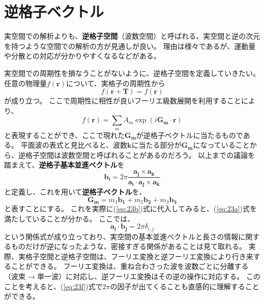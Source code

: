 \documentclass[a4paper]{jsreport}
\begin{document}
        \section{逆格子ベクトル}
            実空間での解析よりも、\textbf{逆格子空間}（波数空間）と呼ばれる、実空間と逆の次元を持つような空間での解析の方が見通しが良い。
            理由は様々であるが、運動量や分散との対応が分かりやすくなるなどがある。\par
            実空間での周期性を損なうことがないように、逆格子空間を定義していきたい。
            任意の物理量$f(\boldsymbol{r})$について、実格子の周期性から
            \begin{equation} \label{eq:23a}
                f(\boldsymbol{r} + \boldsymbol{T}) = f(\boldsymbol{r})
            \end{equation}
            が成り立つ。
            ここで周期性に相性が良いフーリエ級数展開を利用することにより、
            \begin{equation} \label{eq:23b}
                f(\boldsymbol{r}) = \sum_{m} A_m \exp(i\boldsymbol{G_m} \cdot \boldsymbol{r})
            \end{equation}
            と表現することができ、ここで現れた$\boldsymbol{G_m}$が逆格子ベクトルに当たるものである。
            平面波の表式と見比べると、波数$\boldsymbol{k}$に当たる部分が$\boldsymbol{G_m}$になっていることから、逆格子空間は波数空間と呼ばれることがあるのだろう。
            以上までの議論を踏まえて、\textbf{逆格子基本並進ベクトル}を
            \begin{equation}
                \boldsymbol{b_i} = 2 \pi \frac{\boldsymbol{a_j} \times \boldsymbol{a_k}}{\boldsymbol{a_i} \cdot \boldsymbol{a_j} \times \boldsymbol{a_k}}
            \end{equation}
            と定義し、これを用いて\textbf{逆格子ベクトル}を、
            \begin{equation}
                \boldsymbol{G_m} = m_1 \boldsymbol{b_1} + m_2 \boldsymbol{b_2} + m_3 \boldsymbol{b_3}
            \end{equation}
            と表すことにする。
            これを実際に(\ref{eq:23b})式に代入してみると、(\ref{eq:23a})式を満たしていることが分かる。
            ここでは、
            \begin{equation} \label{eq:23f}
                \boldsymbol{a_i} \cdot \boldsymbol{b_j} = 2 \pi \delta_{i,j}
            \end{equation}
            という関係式が成り立っており、実空間の基本並進ベクトルと長さの情報に関するものだけが逆になったような、密接すぎる関係があることは見て取れる。
            実際、実格子空間と逆格子空間は、フーリエ変換と逆フーリエ変換により行き来することができる。
            フーリエ変換は、重ね合わさった波を波数ごとに分離する（波束 → 単一波）に対応し、逆フーリエ変換はその逆の操作に対応する。
            このことを考えると、(\ref{eq:23f})式で$2\pi$の因子が出てくることも直感的に理解することができる。
\end{document}
